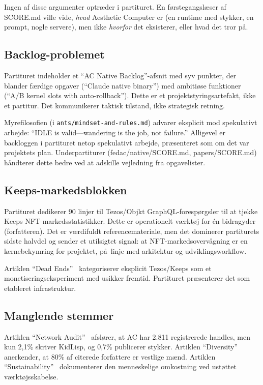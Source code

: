 \documentclass[10pt,letterpaper,twocolumn]{article}
\begin{document}
Ingen af disse argumenter optr\ae der i partituret. En f\o rstegangsl\ae ser af SCORE.md ville vide, \emph{hvad} Aesthetic Computer er (en runtime med stykker, en prompt, nogle servere), men ikke \emph{hvorfor} det eksisterer, eller hvad det tror p\aa .

\subsection{Backlog-problemet}

Partituret indeholder et ``AC Native Backlog''-afsnit med syv punkter, der blander f\ae rdige opgaver (``Claude native binary'') med ambiti\o se funktioner (``A/B kernel slots with auto-rollback''). Dette er et projektstyringsartefakt, ikke et partitur. Det kommunikerer taktisk tilstand, ikke strategisk retning.

Myrefilosofien (i \texttt{ants/mindset-and-rules.md}) advarer eksplicit mod spekulativt arbejde: ``IDLE is valid---wandering is the job, not failure.'' Alligevel er backloggen i partituret netop spekulativt arbejde, pr\ae senteret som om det var projektets plan. Underpartiturer (fedac/native/SCORE.md, papers/SCORE.md) h\aa ndterer dette bedre ved at adskille vejledning fra opgavelister.

\subsection{Keeps-markedsblokken}

Partituret dedikerer 90 linjer til Tezos/Objkt GraphQL-foresp\o rgsler til at tjekke Keeps NFT-markedsstatistikker. Dette er operationelt v\ae rkt\o j for \' en bidragyder (forfatteren). Det er v\ae rdifuldt referencemateriale, men det dominerer partiturets sidste halvdel og sender et utilsigtet signal: at NFT-markedsoverv\aa gning er en kernebekymring for projektet, p\aa\ linje med arkitektur og udviklingsworkflow.

Artiklen ``Dead Ends''~\citep{scudder2026deadends} kategoriserer eksplicit Tezos/Keeps som et monetiseringseksperiment med usikker fremtid. Partituret pr\ae senterer det som etableret infrastruktur.

\subsection{Manglende stemmer}

Artiklen ``Network Audit''~\citep{scudder2026audit} afsl\o rer, at AC har 2.811 registrerede handles, men kun 2,1\% skriver KidLisp, og 0,7\% publicerer stykker. Artiklen ``Diversity''~\citep{scudder2026diversity} anerkender, at 80\% af citerede forfattere er vestlige m\ae nd. Artiklen ``Sustainability''~\citep{scudder2026sustainability} dokumenterer den menneskelige omkostning ved ust\o ttet v\ae rkt\o jsskabelse.
\end{document}
